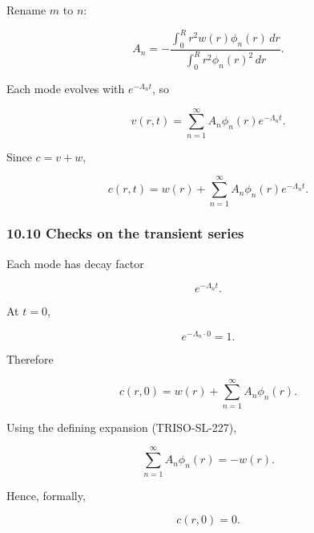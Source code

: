 \documentclass[11pt,a4paper]{article}
\begin{document}
Rename $m$ to $n$:

\begin{equation}
\boxed{
A_n
=
-
\frac{
\int_0^R
r^2w(r)\phi_n(r)\,dr
}{
\int_0^R
r^2\phi_n(r)^2\,dr
}.
}
\tag{TRISO-SL-233}
\label{eq:triso-sl-233}
\end{equation}

Each mode evolves with $e^{-\Lambda_nt}$, so

\begin{equation}
v(r,t)
=
\sum_{n=1}^{\infty}
A_n\phi_n(r)e^{-\Lambda_nt}.
\tag{TRISO-SL-234}
\label{eq:triso-sl-234}
\end{equation}

Since $c=v+w$,

\begin{equation}
\boxed{
c(r,t)
=
w(r)
+
\sum_{n=1}^{\infty}
A_n\phi_n(r)e^{-\Lambda_nt}.
}
\tag{TRISO-SL-235}
\label{eq:triso-sl-235}
\end{equation}

\subsubsection*{10.10 Checks on the transient series}

Each mode has decay factor

\begin{equation}
e^{-\Lambda_nt}.
\tag{TRISO-SL-236}
\label{eq:triso-sl-236}
\end{equation}

At $t=0$,

\begin{equation}
e^{-\Lambda_n\cdot0}=1.
\tag{TRISO-SL-237}
\label{eq:triso-sl-237}
\end{equation}

Therefore

\begin{equation}
c(r,0)
=
w(r)
+
\sum_{n=1}^{\infty}A_n\phi_n(r).
\tag{TRISO-SL-238}
\label{eq:triso-sl-238}
\end{equation}

Using the defining expansion (TRISO-SL-227),

\begin{equation}
\sum_{n=1}^{\infty}A_n\phi_n(r)
=
-w(r).
\tag{TRISO-SL-239}
\label{eq:triso-sl-239}
\end{equation}

Hence, formally,

\begin{equation}
\boxed{
c(r,0)=0.
}
\tag{TRISO-SL-240}
\label{eq:triso-sl-240}
\end{equation}
\end{document}
